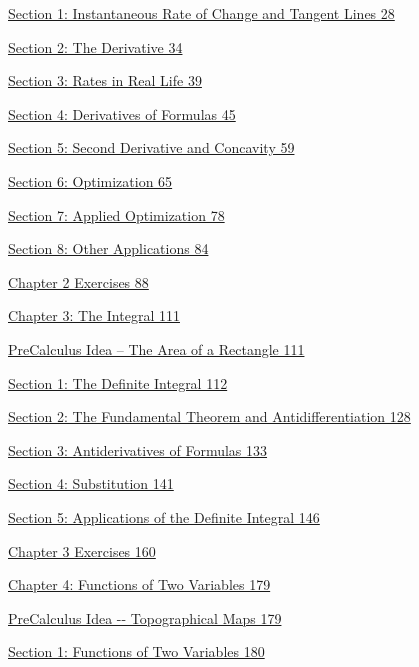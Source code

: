 \protect\hyperlink{section-1-instantaneous-rate-of-change-and-tangent-lines}{Section
1: Instantaneous Rate of Change and Tangent Lines 28}

\protect\hyperlink{section-2-the-derivative}{Section 2: The Derivative
34}

\protect\hyperlink{section-3-rates-in-real-life}{Section 3: Rates in
Real Life 39}

\protect\hyperlink{section-4-derivatives-of-formulas}{Section 4:
Derivatives of Formulas 45}

\protect\hyperlink{section-5-second-derivative-and-concavity}{Section 5:
Second Derivative and Concavity 59}

\protect\hyperlink{section-6-optimization}{Section 6: Optimization 65}

\protect\hyperlink{section-7-applied-optimization}{Section 7: Applied
Optimization 78}

\protect\hyperlink{section-8-other-applications}{Section 8: Other
Applications 84}

\protect\hyperlink{chapter-2-exercises}{Chapter 2 Exercises 88}

\protect\hyperlink{chapter-3-the-integral}{Chapter 3: The Integral 111}

\protect\hyperlink{precalculus-idea-the-area-of-a-rectangle}{PreCalculus
Idea -- The Area of a Rectangle 111}

\protect\hyperlink{section-1-the-definite-integral}{Section 1: The
Definite Integral 112}

\protect\hyperlink{section-2-the-fundamental-theorem-and-antidifferentiation}{Section
2: The Fundamental Theorem and Antidifferentiation 128}

\protect\hyperlink{section-3-antiderivatives-of-formulas}{Section 3:
Antiderivatives of Formulas 133}

\protect\hyperlink{section-4-substitution}{Section 4: Substitution 141}

\protect\hyperlink{section-5-applications-of-the-definite-integral}{Section
5: Applications of the Definite Integral 146}

\protect\hyperlink{chapter-3-exercises}{Chapter 3 Exercises 160}

\protect\hyperlink{chapter-4-functions-of-two-variables}{Chapter 4:
Functions of Two Variables 179}

\protect\hyperlink{precalculus-idea----topographical-maps}{PreCalculus
Idea -\/- Topographical Maps 179}

\protect\hyperlink{section-1-functions-of-two-variables}{Section 1:
Functions of Two Variables 180}

